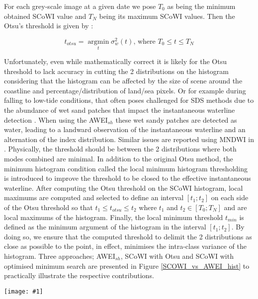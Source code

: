 \documentclass[remotesensing,article,submit,pdftex,moreauthors]{Definitions/mdpi}
\newcommand{\myfigure}[4]{
    \begin{figure*}[ht!]
        \centering
        \texttt{[image: \#1]}	 
        \caption{\itshape#2}
        \label{#3}
    \end{figure*} 
}
\begin{document}
For each grey-scale image at a given date we pose $T_0$ as being the minimum obtained SCoWI value and $T_N$ being its maximum SCoWI values. Then the Otsu's threshold is given by :

\begin{equation}
    t_{otsu} = \operatorname*{argmin}_t \sigma_w^2(t) \text{, where }T_0 \le t \le T_N
\end{equation}

Unfortunately, even while mathematically correct it is likely for the Otsu threshold to lack accuracy in cutting the 2 distributions on the histogram considering that the histogram can be affected by the size of scene around the coastline and percentage/distribution of land/sea pixels. Or for example during falling to low-tide conditions, that often poses challenged for SDS methods due to the abundance of wet sand patches that impact the instantaneous waterline detection \citep{CASTELLE2021107707}. When using the AWEI$_{sh}$ these wet sandy patches are detected as water, leading to a landward observation of the instantaneous waterline and an alternation of the index distribution. Similar issues are reported using MNDWI in \citet{VOS2019_sub}. Physically, the threshold should be between the 2 distributions where both modes combined are minimal. In addition to the original Otsu method, the minimum histogram condition called the local minimum histogram thresholding is introduced to improve the threshold to be closed to the effective instantaneous waterline. After computing the Otsu threshold on the SCoWI histogram, local maximums are computed and selected to define an interval $[t_1 ; t_2]$ on each side of the Otsu threshold so that $t_1 \le t_{otsu} \le t_2$ where $t_1$ and $t_2 \in [T_0;T_N]$ and are local maximums of the histogram. Finally, the local minimum threshold $t_{min}$ is defined as the minimum argument of the histogram in the interval $[t_1 ; t_2]$. By doing so, we ensure that the computed threshold to delimit the 2 distributions as close as possible to the point, in effect, minimises the intra-class variance of the histogram. Three approaches; AWEI$_{sh}$, SCoWI with Otsu and SCoWI with optimised minimum search are presented in Figure \ref{SCOWI_vs_AWEI_hist} to practically illustrate the respective contributions.

\myfigure{img/AWEIsh_vs_SCOWI_crop.png}{a) AWEI$_{sh}$ histogram of this Sentinel-2 acquisition. The dashed blue line is the Otsu threshold value computed for this histogram. b) SCoWI histogram of this Sentinel-2 acquisition in which the dashed green line indicates the Otsu threshold value while the dashed red line shows the position of the local histogram minimum. c) Sentinel-2 acquisition at Capbreton, French Atlantic coast during low tide. Instantaneous waterlines are extracted through the 3 methods: cyan is AWEI$_{sh}$, green represents the SCoWI with Otsu and red shows the SCoWI with local minimum approach. Waterline extracted by the SCoWI combined to the local minimum histogram thresholding method (red line) is the closest to the actual waterline on the acquisition. }{SCOWI_vs_AWEI_hist}{0.8}
\end{document}
